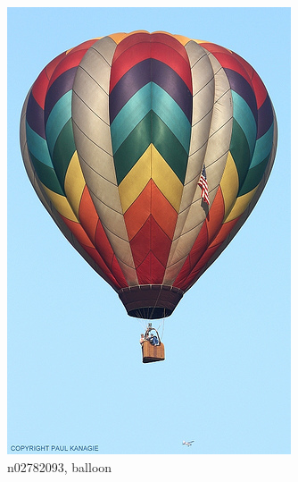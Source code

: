 \documentclass[11pt, a4paper]{article}
\begin{document}
\begin{figure}[h!tb]
\begin{subfigure}[t]{0.30\textwidth}
        \includegraphics[width=\textwidth]{imagenet/examples/n02782093_1001.JPEG}
        \caption{n02782093, balloon}
        \label{fig:imagenet-examples-5}
    \end{subfigure}
    ~ %
    \begin{subfigure}[t]{0.30\textwidth}
    		\centering

\end{subfigure}
\end{figure}
\end{document}
